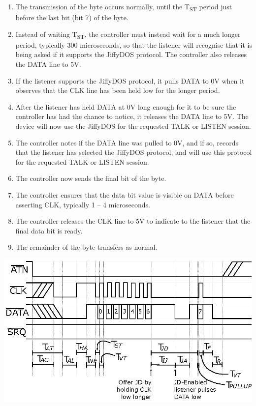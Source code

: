 \begin{enumerate}
  \item The transmission of the byte occurs normally, until the
    T\textsubscript{ST} period just before the last bit (bit 7) of the
    byte.
  \item Instead of waiting T\textsubscript{ST}, the controller must
    instead wait for a much longer period, typically 300
    microseconds, so that the listener will recognise that it is
    being asked if it supports the JiffyDOS{\texttrademark}
    protocol. The controller also releases the DATA line to 5V.
  \item If the listener supports the JiffyDOS{\texttrademark} protocol,
    it pulls DATA to 0V when it observes that the CLK line has been
    held low for the longer period.
  \item After the listener has held DATA at 0V long enough for it
    to be sure the controller has had the chance to notice, it
    releases the DATA line to 5V. The device will now use the
    JiffyDOS{\texttrademark} for the requested TALK or LISTEN session.
  \item The controller notes if the DATA line was pulled to 0V, and if
    so, records that the listener has selected the
    JiffyDOS{\texttrademark} protocol, and will use this protocol for the
    requested TALK or LISTEN session.
  \item The controller now sends the final bit of the byte.
  \item The controller ensures that the data bit value is visible on
    DATA before asserting CLK, typically 1 -- 4 microseconds.
  \item The controller releases the CLK line to 5V to indicate to
    the listener that the final data bit is ready.
  \item The remainder of the byte transfers as normal.
\end{enumerate}

\begin{center}
\includegraphics{images/IEC-Timing-Diagrams/IEC-Timing-Diagram-ATN-JD-Solicit}
\end{center}

